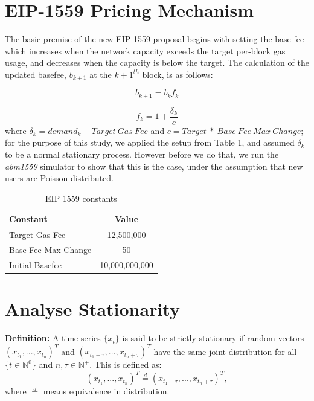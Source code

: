 \documentclass{article}
\begin{document}
\section{EIP-1559 Pricing Mechanism}
\label{section:eip_1559}

The basic premise of the new EIP-1559 proposal begins with setting the base fee which increases when the network capacity exceeds the target per-block gas usage, and decreases when the capacity is below the target. The calculation of the updated basefee, $b_{k+1}$ at the $k+1^{th}$ block, is as follows:

\begin{equation}
b_{k+1} = b_{k}f_{k}
\label{eq:eip1559} 
\end{equation}

\begin{equation}
f_{k} = 1 + \frac{\delta_{k}}{c}
\label{eq:fk} 
\end{equation}
where $\delta_{k} = demand_{k} - Target~Gas~Fee$ and $c = Target ~*~ Base~Fee~Max~Change$; for the purpose of this study, we applied the setup from Table 1, and assumed $\delta_{k}$ to be a normal stationary process. However before we do that, we run the \textit{abm1559} simulator \cite{Mon21} to show that this is the case, under the assumption that new users are Poisson distributed.

\begin{table}[h!]
\centering
\begin{tabular}{ |l|c| } 
\hline
 Constant & Value \\
\hline
Target Gas Fee & 12,500,000 \\
Base Fee Max Change & 50 \\
Initial Basefee & 10,000,000,000\\

\hline
\end{tabular}
\caption{EIP 1559 constants}
\label{table:pow_vs_pos}
\end{table}


\section{Analyse Stationarity}
\label{section:analyze_stationarity}

\textbf{Definition:} A time series $\{x_{t}\}$ is said to be strictly stationary if random vectors $(x_{t_{1}} , ... , x_{t_{n}} )^T $ and $(x_{t_{1}+\tau} , ... , x_{t_{n}+\tau} )^T$ have the same joint distribution for all $\{t \in \mathbb{N}^{0}\}$ and $n,\tau \in \mathbb{N}^{+}$. This is defined as:
\begin{equation}
(x_{t_{1}} , ... , x_{t_{n}})^T \stackrel{d}{=} (x_{t_{1}+\tau} , ... , x_{t_{n}+\tau} )^T,
\label{eq:ar1} 
\end{equation}
where $\stackrel{d}{=}$ means equivalence in distribution.
\end{document}
